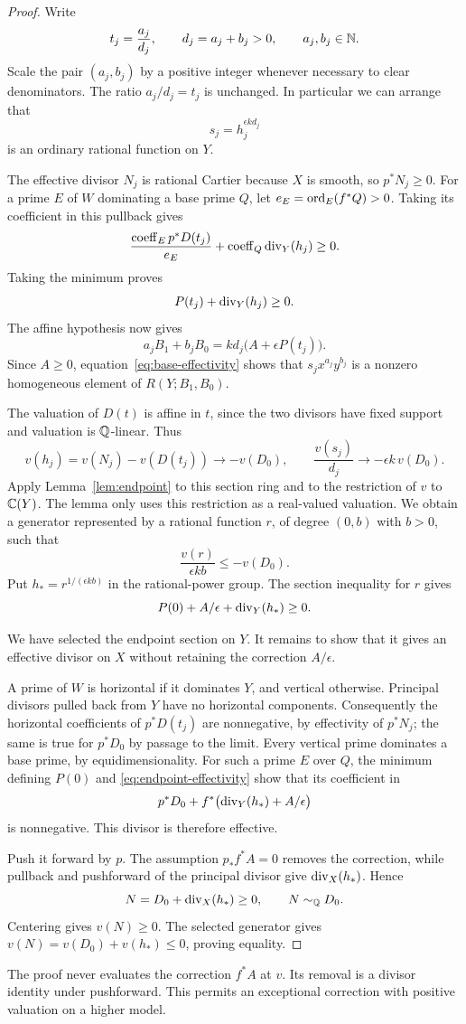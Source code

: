 \begin{proof}
Write
\[
t_j=\frac{a_j}{d_j},\qquad d_j=a_j+b_j>0,
\qquad a_j,b_j\in\mathbb N.
\]
Scale the pair \((a_j,b_j)\) by a positive integer whenever necessary
to clear denominators. The ratio \(a_j/d_j=t_j\) is unchanged.
In particular we can arrange that
\[
s_j=h_j^{\epsilon k d_j}
\]
is an ordinary rational function on \(Y\).

The effective divisor \(N_j\) is rational Cartier because \(X\) is
smooth, so \(p^*N_j\geq0\). For a prime \(E\) of \(W\) dominating a
base prime \(Q\), let \(e_E=\operatorname{ord}_E(f^*Q)>0\). Taking its coefficient
in this pullback gives
\[
\frac{\operatorname{coeff}_E p^*D(t_j)}{e_E}
+\operatorname{coeff}_Q\operatorname{div}_Y(h_j)\geq0.
\]
Taking the minimum proves
\begin{equation}
\label{eq:base-effectivity}
P(t_j)+\operatorname{div}_Y(h_j)\geq0.
\end{equation}
The affine hypothesis now gives
\[
a_jB_1+b_jB_0=k d_j\bigl(A+\epsilon P(t_j)\bigr).
\]
Since \(A\geq0\), equation~\eqref{eq:base-effectivity} shows that
\(s_jx^{a_j}y^{b_j}\) is a nonzero homogeneous element of
\(R(Y;B_1,B_0)\).

The valuation of \(D(t)\) is affine in \(t\), since the two divisors
have fixed support and valuation is \(\mathbb Q\)-linear. Thus
\[
v(h_j)=v(N_j)-v(D(t_j))\longrightarrow-v(D_0),
\qquad
\frac{v(s_j)}{d_j}\longrightarrow-\epsilon k\,v(D_0).
\]
Apply Lemma~\ref{lem:endpoint} to this section ring and to the
restriction of \(v\) to \(\mathbb C(Y)\). The lemma only uses this restriction
as a real-valued valuation. We obtain a
generator represented by a rational function \(r\), of degree
\((0,b)\) with \(b>0\), such that
\[
\frac{v(r)}{\epsilon k b}\leq-v(D_0).
\]
Put \(h_*=r^{1/(\epsilon k b)}\) in the rational-power group.
The section inequality for \(r\) gives
\begin{equation}
\label{eq:endpoint-effectivity}
P(0)+A/\epsilon+\operatorname{div}_Y(h_*)\geq0.
\end{equation}

We have selected the endpoint section on \(Y\). It remains to show that
it gives an effective divisor on \(X\) without retaining the correction
\(A/\epsilon\).

A prime of \(W\) is horizontal if it dominates \(Y\), and vertical
otherwise. Principal divisors pulled back from \(Y\) have no horizontal
components. Consequently the horizontal coefficients of \(p^*D(t_j)\)
are nonnegative, by effectivity of \(p^*N_j\); the same is true for
\(p^*D_0\) by passage to the limit. Every vertical prime dominates a
base prime, by equidimensionality. For such a prime \(E\) over \(Q\),
the minimum defining \(P(0)\) and
\eqref{eq:endpoint-effectivity} show that its coefficient in
\[
p^*D_0+
f^*\bigl(\operatorname{div}_Y(h_*)+A/\epsilon\bigr)
\]
is nonnegative. This divisor is therefore effective.

Push it forward by \(p\). The assumption \(p_*f^*A=0\) removes the
correction, while pullback and pushforward of the principal divisor
give \(\operatorname{div}_X(h_*)\). Hence
\[
N=D_0+\operatorname{div}_X(h_*)\geq0,\qquad N\sim_{\mathbb Q}D_0.
\]
Centering gives \(v(N)\geq0\). The selected generator gives
\(v(N)=v(D_0)+v(h_*)\leq0\), proving equality.
\end{proof}

The proof never evaluates the correction \(f^*A\) at \(v\).
Its removal is a divisor identity under pushforward. This permits an
exceptional correction with positive valuation on a higher model.

